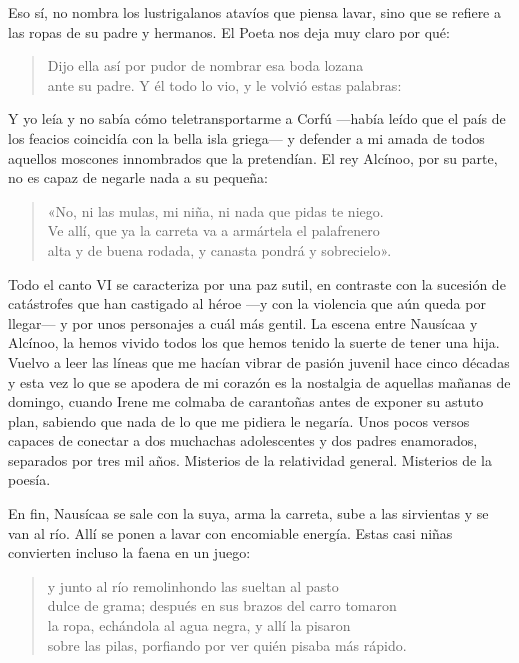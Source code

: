 Eso sí, no nombra los lustrigalanos atavíos que piensa lavar, sino que se refiere a las ropas de su padre y hermanos. El Poeta nos deja muy claro por qué:

\begin{verse}
Dijo ella así por pudor de nombrar esa boda lozana\\
ante su padre. Y él todo lo vio, y le volvió estas palabras:
\end{verse}

Y yo leía y no sabía cómo teletransportarme a Corfú ---había leído que el país de los feacios coincidía con la bella isla griega--- y defender a mi amada de todos aquellos moscones innombrados que la pretendían. El rey Alcínoo, por su parte, no es capaz de negarle nada a su pequeña:

\begin{verse}
«No, ni las mulas, mi niña, ni nada que pidas te niego.\\
Ve allí, que ya la carreta va a armártela el palafrenero\\
alta y de buena rodada, y canasta pondrá y sobrecielo».
\end{verse}

Todo el canto VI se caracteriza por una paz sutil, en contraste con la sucesión de catástrofes que han castigado al héroe ---y con la violencia que aún queda por llegar--- y por unos personajes a cuál más gentil. La escena entre Nausícaa y Alcínoo, la hemos vivido todos los que hemos tenido la suerte de tener una hija. Vuelvo a leer las líneas que me hacían vibrar de pasión juvenil hace cinco décadas y esta vez lo que se apodera de mi corazón es la nostalgia de aquellas mañanas de domingo, cuando Irene me colmaba de carantoñas antes de exponer su astuto plan, sabiendo que nada de lo que me pidiera le negaría. Unos pocos versos capaces de conectar a dos muchachas adolescentes y dos padres enamorados, separados por tres mil años. Misterios de la relatividad general. Misterios de la poesía.

En fin, Nausícaa se sale con la suya, arma la carreta, sube a las sirvientas y se van al río. Allí se ponen a lavar con encomiable energía. Estas casi niñas convierten incluso la faena en un juego:

\begin{verse}
y junto al río remolinhondo las sueltan al pasto\\
dulce de grama; después en sus brazos del carro tomaron\\
la ropa, echándola al agua negra, y allí la pisaron\\
sobre las pilas, porfiando por ver quién pisaba más rápido.
\end{verse}

